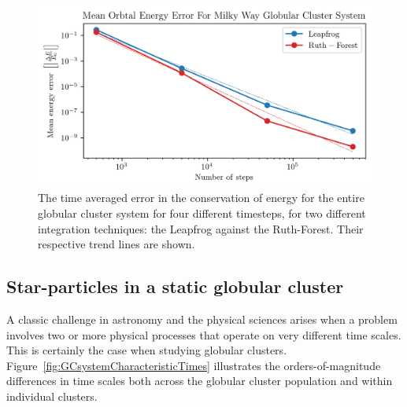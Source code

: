         \begin{figure}
            \centering
            \includegraphics[width=\linewidth]{images/numericalErrorMeanEnergyErrorRuthForestLeapfrog.png}
            \caption[Relative orbital energy comparison between leapfrog and Forest-Ruth]{The time averaged error in the conservation of energy for the entire globular cluster system for four different timesteps, for two different integration techniques: the Leapfrog against the Ruth-Forest. Their respective trend lines are shown.}
            \label{fig:numericalErrorMeanEnergyErrorRuthForestLeapfrog}
        \end{figure}

    \subsection{Star-particles in a static globular cluster}

        
        A classic challenge in astronomy and the physical sciences arises when a problem involves two or more physical processes that operate on very different time scales. This is certainly the case when studying globular clusters. Figure~\ref{fig:GCsystemCharacteristicTimes} illustrates the orders-of-magnitude differences in time scales both across the globular cluster population and within individual clusters.

